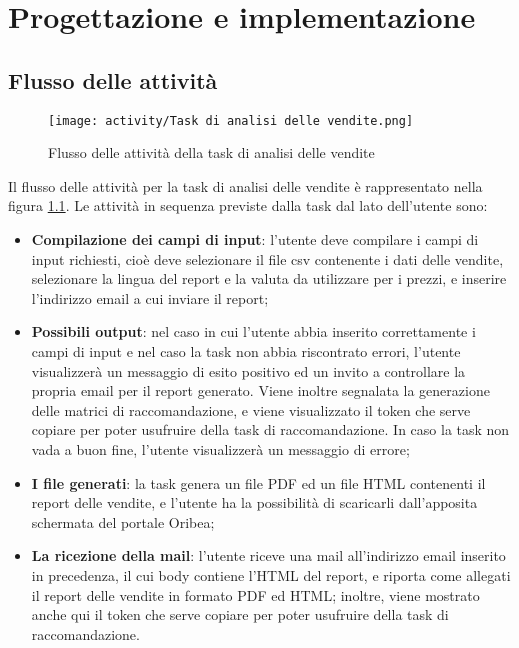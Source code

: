 \chapter{Progettazione e implementazione}
\label{cap:progettazione-implementazione}



\section{Flusso delle attività}

\begin{figure}[!h]
    \centering 
    \texttt{[image: activity/Task di analisi delle vendite.png]}
    \caption{Flusso delle attività della task di analisi delle vendite}
    \label{fig:activity-sales-analysis}
\end{figure}

Il flusso delle attività per la task di analisi delle vendite è rappresentato nella figura \ref{fig:activity-sales-analysis}. Le attività in sequenza previste dalla task dal lato dell'utente sono:
\begin{itemize}
    \item \textbf{Compilazione dei campi di input}: l'utente deve compilare i campi di input richiesti, cioè deve selezionare il file \gls{csv} contenente i dati delle vendite, selezionare la lingua del report e la valuta da utilizzare per i prezzi, e inserire l'indirizzo email a cui inviare il report;
    \item \textbf{Possibili output}: nel caso in cui l'utente abbia inserito correttamente i campi di input e nel caso la task non abbia riscontrato errori, l'utente visualizzerà un messaggio di esito positivo ed un invito a controllare la propria email per il report generato. Viene inoltre segnalata la generazione delle matrici di raccomandazione, e viene visualizzato il token che serve copiare per poter usufruire della task di raccomandazione. In caso la task non vada a buon fine, l'utente visualizzerà un messaggio di errore;
    \item \textbf{I file generati}: la task genera un file PDF ed un file HTML contenenti il report delle vendite, e l'utente ha la possibilità di scaricarli dall'apposita schermata del portale Oribea;
    \item \textbf{La ricezione della mail}: l'utente riceve una mail all'indirizzo email inserito in precedenza, il cui body contiene l'HTML del report, e riporta come allegati il report delle vendite in formato PDF ed HTML; inoltre, viene mostrato anche qui il token che serve copiare per poter usufruire della task di raccomandazione.
\end{itemize}


